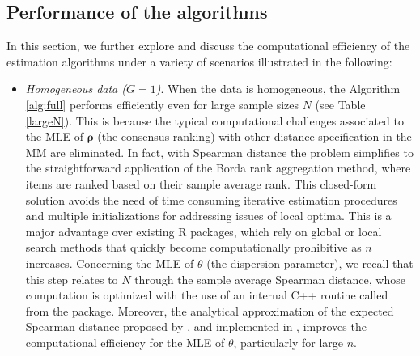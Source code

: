 \subsection{Performance of the algorithms}
\label{app:scalability}

In this section, we further explore and discuss the computational efficiency of the estimation algorithms under a variety of scenarios illustrated in the following:
\begin{itemize}
    \item \textit{Homogeneous data ($G = 1$)}. When the data is homogeneous, the Algorithm \ref{alg:full} performs efficiently even for large sample sizes $N$ (see Table \ref{largeN}). This is because the typical computational challenges associated to the MLE of $\bm\rho$ (the consensus ranking) with other distance specification in the MM are eliminated. In fact, with Spearman distance the problem simplifies to the straightforward application of the Borda rank aggregation method, where items are ranked based on their sample average rank.
    This closed-form solution avoids the need of time consuming iterative estimation procedures and multiple initializations for addressing issues of local optima.  This is a major advantage over existing R packages, which rely on global or local search methods that quickly become computationally prohibitive as $n$ increases. Concerning the MLE of $\theta$ (the dispersion parameter), we recall that this step relates to $N$ through the sample average Spearman distance, whose computation is optimized with the use of an internal  C++ routine called from the  package. Moreover, the analytical approximation of the expected Spearman distance proposed by \cite{crispino23efficient}, and implemented in , improves the computational efficiency for the MLE of $\theta$, particularly for large $n$.


\end{itemize}
